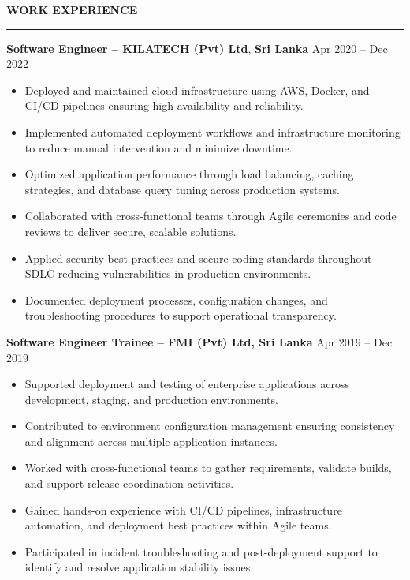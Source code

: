 \documentclass[10pt,letterpaper]{article}
\begin{document}
\vspace{8pt}

\textbf{WORK EXPERIENCE}\\[-8pt]
\noindent\rule{\textwidth}{1pt}

\vspace{-2pt}

\textbf{Software Engineer -- KILATECH (Pvt) Ltd}, \textbf{Sri Lanka} \hfill Apr 2020 -- Dec 2022

\vspace{-1pt}

\begin{itemize}
\item Deployed and maintained cloud infrastructure using AWS, Docker, and CI/CD pipelines ensuring high availability and reliability.
\item Implemented automated deployment workflows and infrastructure monitoring to reduce manual intervention and minimize downtime.
\item Optimized application performance through load balancing, caching strategies, and database query tuning across production systems.
\item Collaborated with cross-functional teams through Agile ceremonies and code reviews to deliver secure, scalable solutions.
\item Applied security best practices and secure coding standards throughout SDLC reducing vulnerabilities in production environments.
\item Documented deployment processes, configuration changes, and troubleshooting procedures to support operational transparency.
\end{itemize}

\textbf{Software Engineer Trainee -- FMI (Pvt) Ltd, Sri Lanka} \hfill Apr 2019 -- Dec 2019

\vspace{-1pt}

\begin{itemize}
\item Supported deployment and testing of enterprise applications across development, staging, and production environments.
\item Contributed to environment configuration management ensuring consistency and alignment across multiple application instances.
\item Worked with cross-functional teams to gather requirements, validate builds, and support release coordination activities.
\item Gained hands-on experience with CI/CD pipelines, infrastructure automation, and deployment best practices within Agile teams.
\item Participated in incident troubleshooting and post-deployment support to identify and resolve application stability issues.
\end{itemize}
\end{document}

